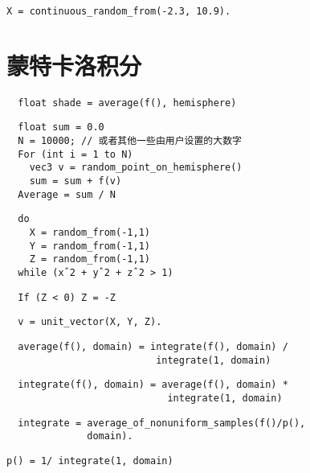 \documentclass[lang=cn,12pt,marginpar=margintrue]{elegantbook}
\begin{document}
\verb"X = continuous_random_from(-2.3, 10.9)."

\section{蒙特卡洛积分}

\begin{lstlisting}
  float shade = average(f(), hemisphere)
\end{lstlisting}

\begin{lstlisting}
  float sum = 0.0
  N = 10000; // 或者其他一些由用户设置的大数字
  For (int i = 1 to N)
    vec3 v = random_point_on_hemisphere()
    sum = sum + f(v)
  Average = sum / N
\end{lstlisting}

\begin{lstlisting}
  do
    X = random_from(-1,1)
    Y = random_from(-1,1)
    Z = random_from(-1,1)
  while (xˆ2 + yˆ2 + zˆ2 > 1)
\end{lstlisting}

\begin{lstlisting}
  If (Z < 0) Z = -Z
\end{lstlisting}

\begin{lstlisting}
  v = unit_vector(X, Y, Z).
\end{lstlisting}

\begin{lstlisting}
  average(f(), domain) = integrate(f(), domain) /
                          integrate(1, domain)
\end{lstlisting}

\begin{lstlisting}
  integrate(f(), domain) = average(f(), domain) *
                            integrate(1, domain)
\end{lstlisting}

\begin{lstlisting}
  integrate = average_of_nonuniform_samples(f()/p(),
              domain).
\end{lstlisting}

\verb"p() = 1/ integrate(1, domain)"
\end{document}
